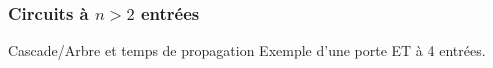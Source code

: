 \documentclass{beamer}
\begin{document}
\begin{frame}
  \frametitle{Circuits à $n > 2$ entrées}
  \begin{block}{Cascade/Arbre et temps de propagation}
    Exemple d'une porte ET à 4 entrées.\\
    \begin{minipage}[c]{.46\linewidth}
      \begin{overprint}

\end{overprint}
\end{minipage}
\end{block}
\end{frame}
\end{document}
